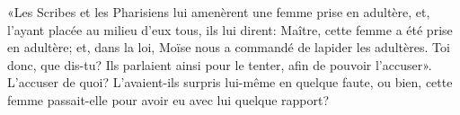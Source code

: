 «Les Scribes et les Pharisiens lui amenèrent une femme prise en adultère,
	et, l’ayant placée au milieu d’eux tous, ils lui dirent:
	Maître, cette femme a été prise en adultère;
	et, dans la loi, Moïse nous a commandé de lapider les adultères.
	Toi donc, que dis-tu?
Ils parlaient ainsi pour le tenter, afin de pouvoir l’accuser».
L’accuser de quoi?
L’avaient-ils surpris lui-même en quelque faute,
	ou bien, cette femme passait-elle pour avoir eu avec lui quelque rapport?
